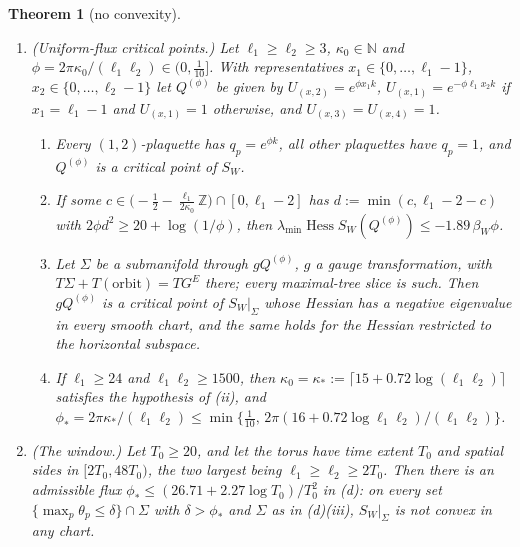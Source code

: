 \documentclass[11pt,a4paper]{amsart}
\newtheorem{theorem}{Theorem}[section]
\theoremstyle{definition}
\theoremstyle{remark}
\numberwithin{equation}{section}
\DeclareMathOperator{\Hess}{Hess}    %
\newcommand{\Z}{\mathbb{Z}}          %
\newcommand{\Nat}{\mathbb{N}}        %
\newcommand{\betaW}{\beta_{W}}             %
\begin{document}
\begin{theorem}[no convexity]
\begin{enumerate}[label=\textup{(\alph*)},leftmargin=*]
\item \textup{(Uniform-flux critical points.)} Let $\ell_1\ge\ell_2\ge3$, $\kappa_0\in\Nat$ and $\phi=2\pi\kappa_0/(\ell_1\ell_2)\in(0,\frac1{10}]$. With representatives $x_1\in\{0,\dots,\ell_1-1\}$, $x_2\in\{0,\dots,\ell_2-1\}$ let $Q^{(\phi)}$ be given by $U_{(x,2)}=e^{\phi x_1k}$, $U_{(x,1)}=e^{-\phi\ell_1x_2k}$ if $x_1=\ell_1-1$ and $U_{(x,1)}=1$ otherwise, and $U_{(x,3)}=U_{(x,4)}=1$.
\begin{enumerate}[label=\textup{(\roman*)}]
\item Every $(1,2)$-plaquette has $q_p=e^{\phi k}$, all other plaquettes have $q_p=1$, and $Q^{(\phi)}$ is a critical point of $S_W$.
\item If some $c\in\bigl(-\frac12-\frac{\ell_1}{2\kappa_0}\Z\bigr)\cap[0,\ell_1-2]$ has $d:=\min(c,\ell_1-2-c)$ with $2\phi d^2\ge20+\log(1/\phi)$, then $\lambda_{\min}\Hess S_W(Q^{(\phi)})\le-1.89\,\betaW\phi$.
\item Let $\Sigma$ be a submanifold through $gQ^{(\phi)}$, $g$ a gauge transformation, with $T\Sigma+T(\text{orbit})=TG^E$ there; every maximal-tree slice is such. Then $gQ^{(\phi)}$ is a critical point of $S_W|_\Sigma$ whose Hessian has a negative eigenvalue in every smooth chart, and the same holds for the Hessian restricted to the horizontal subspace.
\item If $\ell_1\ge24$ and $\ell_1\ell_2\ge1500$, then $\kappa_0=\kappa_*:=\lceil15+0.72\log(\ell_1\ell_2)\rceil$ satisfies the hypothesis of \textup{(ii)}, and $\phi_*=2\pi\kappa_*/(\ell_1\ell_2)\le\min\{\frac1{10},\,2\pi(16+0.72\log\ell_1\ell_2)/(\ell_1\ell_2)\}$.
\end{enumerate}
\item \textup{(The window.)} Let $T_0\ge20$, and let the torus have time extent $T_0$ and spatial sides in $[2T_0,48T_0)$, the two largest being $\ell_1\ge\ell_2\ge2T_0$. Then there is an admissible flux $\phi_*\le(26.71+2.27\log T_0)/T_0^2$ in \textup{(d)}: on every set $\{\max_p\theta_p\le\delta\}\cap\Sigma$ with $\delta>\phi_*$ and $\Sigma$ as in \textup{(d)(iii)}, $S_W|_\Sigma$ is not convex in any chart.
\end{enumerate}
\end{theorem}
\end{document}
